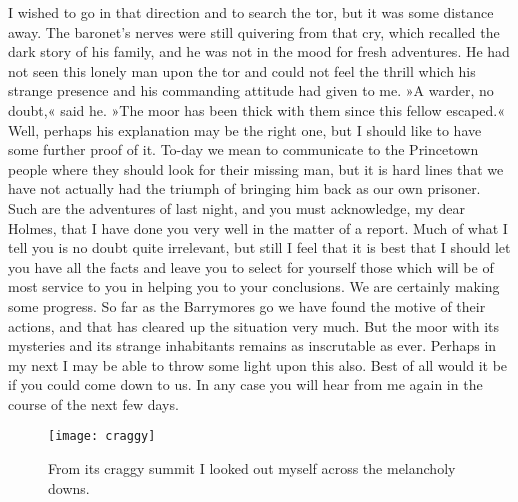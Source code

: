 I wished to go in that direction and to search the tor, but it was some distance away. The baronet's nerves were still quivering from that cry, which recalled the dark story of his family, and he was not in the mood for fresh adventures. He had not seen this lonely man upon the tor and could not feel the thrill which his strange presence and his commanding attitude had given to me. »A warder, no doubt,« said he. »The moor has been thick with them since this fellow escaped.« Well, perhaps his explanation may be the right one, but I should like to have some further proof of it. To-day we mean to communicate to the Princetown people where they should look for their missing man, but it is hard lines that we have not actually had the triumph of bringing him back as our own prisoner. Such are the adventures of last night, and you must acknowledge, my dear Holmes, that I have done you very well in the matter of a report. Much of what I tell you is no doubt quite irrelevant, but still I feel that it is best that I should let you have all the facts and leave you to select for yourself those which will be of most service to you in helping you to your conclusions. We are certainly making some progress. So far as the Barrymores go we have found the motive of their actions, and that has cleared up the situation very much. But the moor with its mysteries and its strange inhabitants remains as inscrutable as ever. Perhaps in my next I may be able to throw some light upon this also. Best of all would it be if you could come down to us. In any case you will hear from me again in the course of the next few days.
\clearpage
\vfill
\begin{figure}[tbph]
\centering
\texttt{[image: craggy]}
\caption{From its craggy summit I looked out myself across the melancholy downs.}
\end{figure}
\vfill
\thispagestyle{empty}
\clearpage
